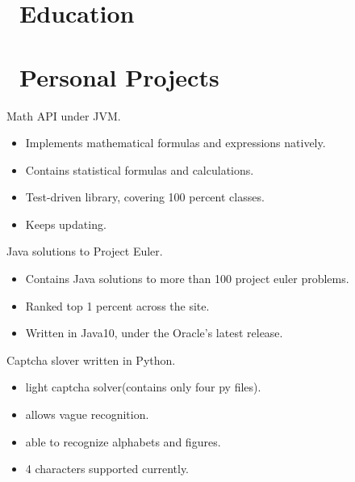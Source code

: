 \documentclass{resume}
\begin{document}



\section{\faGraduationCap\ Education}

\section{\faGithubAlt\ Personal Projects}
Math API under JVM.
\begin{itemize}
  \item Implements mathematical formulas and expressions natively.
  \item Contains statistical formulas and calculations.
  \item Test-driven library, covering 100 percent classes.
  \item Keeps updating.
\end{itemize}

Java solutions to Project Euler.
\begin{itemize}
  \item Contains Java solutions to more than 100 project euler problems.
  \item Ranked top 1 percent across the site.
  \item Written in Java10, under the Oracle's latest release.
\end{itemize}

Captcha slover written in Python.
\begin{itemize}
  \item light captcha solver(contains only four py files).
  \item allows vague recognition.
  \item able to recognize alphabets and figures.
  \item 4 characters supported currently.
\end{itemize}
\end{document}
